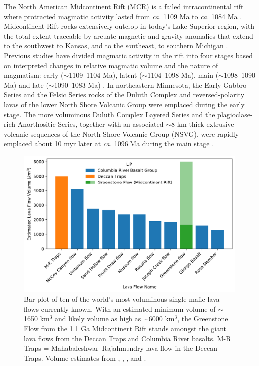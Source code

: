 \documentclass[draft]{agujournal2019}
\begin{document}
The North American Midcontinent Rift (MCR) is a failed intracontinental rift where protracted magmatic activity lasted from \textit{ca.} 1109 Ma to \textit{ca.} 1084 Ma \cite{Swanson-Hysell2019a}. Midcontinent Rift rocks extensively outcrop in today's Lake Superior region, with the total extent traceable by arcuate magnetic and gravity anomalies that extend to the southwest to Kansas, and to the southeast, to southern Michigan \cite{Hinze2020a}. Previous studies have divided magmatic activity in the rift into four stages based on interpreted changes in relative magmatic volume and the nature of magmatism: early ($\sim$1109–1104 Ma), latent ($\sim$1104–1098 Ma), main ($\sim$1098–1090 Ma) and late ($\sim$1090–1083 Ma) \cite{Vervoort2007a, Heaman2007a, Miller2013a}. In northeastern Minnesota, the Early Gabbro Series and the Felsic Series rocks of the Duluth Complex and reversed-polarity lavas of the lower North Shore Volcanic Group were emplaced during the early stage. The more voluminous Duluth Complex Layered Series and the plagioclase-rich Anorthositic Series, together with an associated $\sim$8 km thick extrusive volcanic sequences of the North Shore Volcanic Group (NSVG), were rapidly emplaced about 10 myr later at \textit{ca.} 1096 Ma during the main stage \cite{Paces1993a, Swanson-Hysell2020a}. 

\begin{figure}[h!]
\noindent\includegraphics[width=\textwidth]{Lava_flow_rank.pdf}
\caption{\footnotesize{Bar plot of ten of the world's most voluminous single mafic lava flows currently known. With an estimated minimum volume of $\sim$1650 km$^3$ and likely volume as high as $\sim$6000 km$^3$, the Greenstone Flow from the 1.1 Ga Midcontinent Rift stands amongst the giant lava flows from the Deccan Traps and Columbia River basalts. M-R Traps = Mahabaleshwar–Rajahmundry lava flow in the Deccan Traps. Volume estimates from , , , and .}}
\label{fig:lava_flow_rank}
\end{figure}
\end{document}
